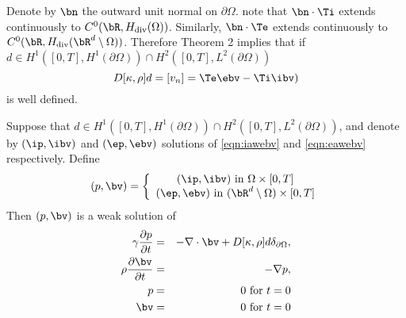 Denote by $\bn$ the outward unit normal on $\partial \Omega$. note
that $\bn \cdot \Ti$ extends continuously to  $C^0(\bR,H_{\rm
  div}(\Omega))$. Similarly,
$\bn \cdot \Te$ extends continuously to $C^0(\bR, H_{\rm div}(\bR^d \setminus \Omega))$.
Therefore Theorem 2 implies that if $d \in H^1([0,T], H^1(\partial \Omega)) \cap H^2([0,T],L^2(\partial
  \Omega))$
\begin{equation}
\label{eqn:dton}
D[\kappa,\rho]d =[v_n] = \Te \ebv - \Ti \ibv)
\end{equation}
is well defined.

\begin{thm}
Suppose that $d \in H^1([0,T], H^1(\partial \Omega)) \cap H^2([0,T],L^2(\partial
  \Omega))$, and denote by $(\ip,\ibv)$ and $(\ep,\ebv)$ solutions of
  \ref{eqn:iawebv} and \ref{eqn:eawebv} respectively. Define 
\begin{equation}
\label{eqn:both}
(p,\bv)= \left\{
\begin{array}{c}
(\ip,\ibv) \mbox{ in } \Omega \times [0,T]\\
(\ep,\ebv) \mbox{ in } (\bR^d \setminus \Omega) \times [0,T] 
\end{array}
\right.
\end{equation}
Then $(p,\bv)$ is a weak solution of 
\begin{eqnarray}
\label{eqn:awe1}
\gamma \frac{\partial p}{\partial t} & = & - \nabla \cdot \bv +
D[\kappa,\rho]d \delta_{\partial \Omega}, \nonumber \\
\rho \frac{\partial \bv}{\partial t} & = & - \nabla p,\nonumber \\
p & =& 0 \mbox{ for } t= 0\nonumber\\ 
\bv & = & 0 \mbox{ for } t= 0
\end{eqnarray}
\end{thm}

